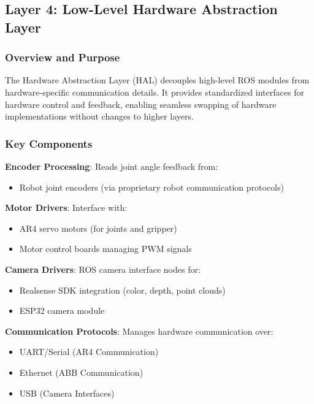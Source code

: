 \subsection{Layer 4: Low-Level Hardware Abstraction Layer}
\label{subsec:hardware_abstraction_layer}

\subsubsection{Overview and Purpose}
The Hardware Abstraction Layer (HAL) decouples high-level ROS modules from hardware-specific communication details. It provides standardized interfaces for hardware control and feedback, enabling seamless swapping of hardware implementations without changes to higher layers.

\subsubsection{Key Components}

\textbf{Encoder Processing}: Reads joint angle feedback from:
\begin{itemize}
    \item Robot joint encoders (via proprietary robot communication protocols)
\end{itemize}
\clearpage

\textbf{Motor Drivers}: Interface with:
\begin{itemize}
    \item AR4 servo motors (for joints and gripper)
    \item Motor control boards managing PWM signals 
\end{itemize}

\textbf{Camera Drivers}: ROS camera interface nodes for:
\begin{itemize}
    \item Realsense SDK integration (color, depth, point clouds)
    \item ESP32 camera module 
\end{itemize}

\textbf{Communication Protocols}: Manages hardware communication over:
\begin{itemize}
    \item UART/Serial (AR4 Communication)
    \item Ethernet (ABB Communication)
    \item USB (Camera Interfaces)
\end{itemize}

